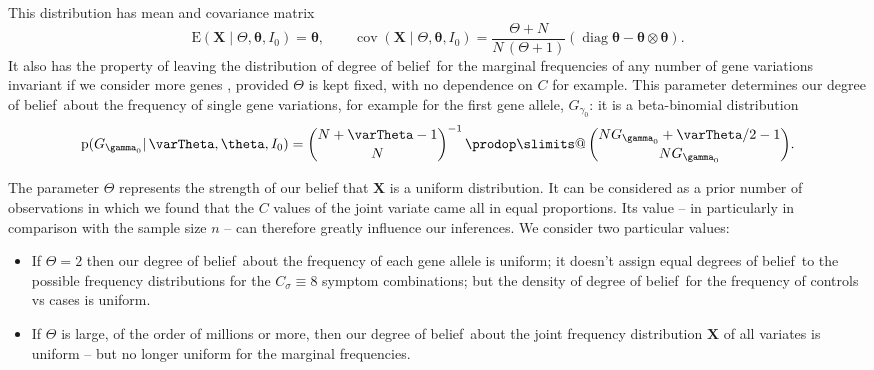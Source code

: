 \documentclass[\ifafour a4paper,12pt,\else a5paper,10pt,\fi%
onecolumn,oneside,article,%
british%
]{memoir}
\makeatletter
\theoremstyle{remark}
\theoremstyle{innote}
\def\sum{\DOTSI\sumop\slimits@}
\def\prod{\DOTSI\prodop\slimits@}
\newcommand*{\citep}{\parencites}
\newcommand*{\delt}{\deltaup}%
\newcommand*{\di}{\mathrm{d}}%
\newcommand*{\pf}{\mathrm{p}}%
\renewcommand*{\|}{\mathpunct{|}}
\newcommand*{\sects}{\S\S}%
\newcommand*{\tprod}{\mathop{\textstyle\prod}\nolimits}
\newcommand*{\tsum}{\mathop{\textstyle\sum}\nolimits}
\newcommand*{\E}{\mathrm{E}}
\DeclareMathOperator{\cov}{cov}
\DeclareMathOperator{\diag}{diag}
\newcommand*{\dob}{degree of belief}
\newcommand*{\dobs}{degrees of belief}
\newcommand*{\ysum}{\tsum}
\newcommand*{\yprod}{\tprod}
\newcommand*{\yg}{\gamma}
\newcommand*{\yFs}{\bm{S}}
\newcommand*{\yF}{\bm{X}}
\newcommand*{\yCs}{C_{\sigma}}
\newcommand*{\yIo}{I_{0}}
\newcommand*{\yA}{\varTheta}
\newcommand*{\ya}{\bm{\theta}}
\makeatother
\begin{document}
This distribution has mean and covariance matrix
\begin{equation}\label{eq:pre_NO-mean_covariance_dirichlet}
  \E(\yF \| \yA, \ya,\yIo) = \ya, \qquad
  \cov(\yF \| \yA, \ya,\yIo) =
  \frac{\yA+N}{N\,(\yA+1)}(\diag\ya -\ya\otimes\ya).
\end{equation}
It also has the property of leaving the distribution of \dob\ for the
marginal frequencies of any number of gene variations invariant if we
consider more genes \citep[\sects~3--4]{basuetal1982}, provided $\yA$ is
kept fixed, with no dependence on $C$ for example. This parameter
determines our \dob\ about the frequency of single gene variations, for
example for the first gene allele, $G_{\yg_0}$: it is a beta-binomial
distribution
\begin{equation}
  \label{eq:pre_NO-dirichlet_prior_marginal_beta-binomial}
  \pf(G_{\yg_0} \| \yA, \ya,\yIo) =
  \binom{N+\yA-1}{N}^{-1} \yprod\binom{N G_{\yg_0}+\yA/2-1}{N G_{\yg_0}}.
\end{equation}

The parameter $\yA$ represents the strength of our belief that $\yF$ is a
uniform distribution. It can be considered as a prior number of
observations in which we found that the $C$ values of the joint variate
came all in equal proportions. Its value -- in particularly in comparison
with the sample size $n$ -- can therefore greatly influence
our inferences. We consider two particular values:
\begin{itemize}[label=--]
\item If $\yA=2$ then our \dob\ about the frequency of each gene allele is
  uniform; it doesn't assign equal \dobs\ to the possible frequency
  distributions for the $\yCs\equiv 8$ symptom combinations; %
  but the density of \dob\ for the frequency of controls vs cases is
  uniform.
\item If $\yA$ is large, of the order of millions or more, then our \dob\
  about the joint frequency distribution $\yF$ of all variates is uniform
  -- but no longer uniform for the marginal frequencies.
\end{itemize}
\end{document}
